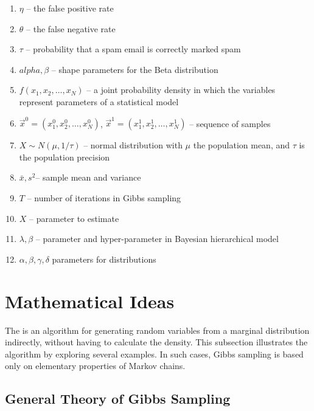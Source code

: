 \documentclass[12pt]{article}
\begin{document}
\begin{enumerate}
    \item
        \( \eta \) -- the false positive rate
    \item
        \( \theta \) -- the false negative rate
    \item
        \( \tau \) -- probability that a spam email is correctly marked
        spam
    \item
        \( alpha, \beta \) -- shape parameters for the Beta distribution
    \item
        \( f(x_1, x_2, \dots, x_N) \) -- a joint probability density in
        which the variables represent parameters of a statistical model
    \item
        \( \overrightarrow{x}^0 = (x_1^0, x_2^0, \dots, x_N^0) \), \(
        \overrightarrow{x}^1 = (x_1^1, x_2^1, \dots, x_N^1) \) --
        sequence of samples
    \item
        \( X \sim N(\mu, 1/\tau) \) -- normal distribution with \( \mu \)
        the population mean, and \( \tau \) is the population precision
    \item
        \( \bar{x}, s^2 \)-- sample mean and variance
    \item
        \( T \) -- number of iterations in Gibbs sampling
    \item
        \( X \) -- parameter to estimate
    \item
        \( \lambda, \beta \) -- parameter and hyper-parameter in
        Bayesian hierarchical model
    \item
        \( \alpha, \beta, \gamma, \delta \) parameters for distributions
\end{enumerate}

\section*{Mathematical Ideas}

The %
is an algorithm for generating random variables from a marginal
distribution indirectly, without having to calculate the density.  This
subsection illustrates the algorithm by exploring several examples.  In
such cases, Gibbs sampling is based only on elementary properties of
Markov chains.

\subsection*{General Theory of Gibbs Sampling}
\end{document}
